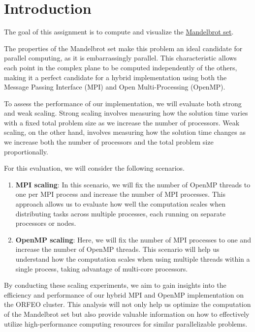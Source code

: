 \section{Introduction}

The goal of this assignment is to compute and visualize the \href{https://en.wikipedia.org/wiki/Mandelbrot_set}{Mandelbrot set}.

The properties of the Mandelbrot set make this problem an ideal candidate for parallel computing, as it is embarrassingly parallel. This characteristic allows each point in the complex plane to be computed independently of the others, making it a perfect candidate for a hybrid implementation using both the Message Passing Interface (MPI) and Open Multi-Processing (OpenMP).

To assess the performance of our implementation, we will evaluate both strong and weak scaling. Strong scaling involves measuring how the solution time varies with a fixed total problem size as we increase the number of processors. Weak scaling, on the other hand, involves measuring how the solution time changes as we increase both the number of processors and the total problem size proportionally.

For this evaluation, we will consider the following scenarios.

\begin{enumerate}
\item \textbf{MPI scaling}: In this scenario, we will fix the number of OpenMP threads to one per MPI process and increase the number of MPI processes. This approach allows us to evaluate how well the computation scales when distributing tasks across multiple processes, each running on separate processors or nodes.
\item \textbf{OpenMP scaling}: Here, we will fix the number of MPI processes to one and increase the number of OpenMP threads. This scenario will help us understand how the computation scales when using multiple threads within a single process, taking advantage of multi-core processors.
\end{enumerate}

By conducting these scaling experiments, we aim to gain insights into the efficiency and performance of our hybrid MPI and OpenMP implementation on the ORFEO cluster. This analysis will not only help us optimize the computation of the Mandelbrot set but also provide valuable information on how to effectively utilize high-performance computing resources for similar parallelizable problems.

